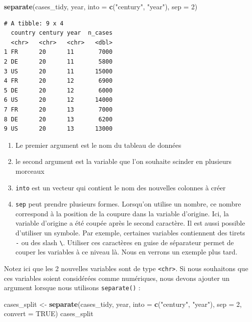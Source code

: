 \documentclass[a4paperpaper,]{article}
\newenvironment{Shaded}{\begin{snugshade}}{\end{snugshade}}
\newcommand{\DataTypeTok}[1]{\textcolor[rgb]{0.00,0.34,0.68}{#1}}
\newcommand{\DecValTok}[1]{\textcolor[rgb]{0.69,0.50,0.00}{#1}}
\newcommand{\KeywordTok}[1]{\textcolor[rgb]{0.12,0.11,0.11}{\textbf{#1}}}
\newcommand{\NormalTok}[1]{\textcolor[rgb]{0.12,0.11,0.11}{#1}}
\newcommand{\OtherTok}[1]{\textcolor[rgb]{0.00,0.43,0.16}{#1}}
\newcommand{\StringTok}[1]{\textcolor[rgb]{0.75,0.01,0.01}{#1}}
\providecommand{\tightlist}{%
  \setlength{\itemsep}{0pt}\setlength{\parskip}{0pt}}
\theoremstyle{definition}
\theoremstyle{definition}
\theoremstyle{definition}
\theoremstyle{remark}
\begin{document}
\begin{Shaded}
\begin{Highlighting}[]
\KeywordTok{separate}\NormalTok{(cases_tidy, year, }\DataTypeTok{into =} \KeywordTok{c}\NormalTok{(}\StringTok{"century"}\NormalTok{, }\StringTok{"year"}\NormalTok{), }\DataTypeTok{sep =} \DecValTok{2}\NormalTok{)}
\end{Highlighting}
\end{Shaded}

\begin{verbatim}
# A tibble: 9 x 4
  country century year  n_cases
  <chr>   <chr>   <chr>   <dbl>
1 FR      20      11       7000
2 DE      20      11       5800
3 US      20      11      15000
4 FR      20      12       6900
5 DE      20      12       6000
6 US      20      12      14000
7 FR      20      13       7000
8 DE      20      13       6200
9 US      20      13      13000
\end{verbatim}

\begin{enumerate}
\def\labelenumi{\arabic{enumi}.}
\tightlist
\item
  Le premier argument est le nom du tableau de données
\item
  le second argument est la variable que l'on souhaite scinder en
  plusieurs morceaux
\item
  \texttt{into} est un vecteur qui contient le nom des nouvelles
  colonnes à créer
\item
  \texttt{sep} peut prendre plusieurs formes. Lorsqu'on utilise un
  nombre, ce nombre correspond à la position de la coupure dans la
  variable d'origine. Ici, la variable d'origine a été coupée après le
  second caractère. Il est aussi possible d'utiliser un symbole. Par
  exemple, certaines variables contiennent des tirets \texttt{-} ou des
  slash \texttt{\textbackslash{}}. Utiliser ces caractères en guise de
  séparateur permet de couper les variables à ce niveau là. Nous en
  verrons un exemple plus tard.
\end{enumerate}

Notez ici que les 2 nouvelles variables sont de type
\texttt{\textless{}chr\textgreater{}}. Si nous souhaitons que ces
variables soient considérées comme numériques, nous devons ajouter un
argument lorsque nous utilisons \texttt{separate()} :

\begin{Shaded}
\begin{Highlighting}[]
\NormalTok{cases_split <-}\StringTok{ }\KeywordTok{separate}\NormalTok{(cases_tidy, year, }\DataTypeTok{into =} \KeywordTok{c}\NormalTok{(}\StringTok{"century"}\NormalTok{, }\StringTok{"year"}\NormalTok{), }\DataTypeTok{sep =} \DecValTok{2}\NormalTok{, }\DataTypeTok{convert =} \OtherTok{TRUE}\NormalTok{)}
\NormalTok{cases_split}
\end{Highlighting}
\end{Shaded}
\end{document}
